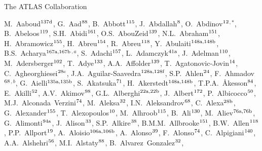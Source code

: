 \begin{flushleft}
{\Large The ATLAS Collaboration}

\bigskip

M.~Aaboud$^\textrm{\scriptsize 137d}$,
G.~Aad$^\textrm{\scriptsize 88}$,
B.~Abbott$^\textrm{\scriptsize 115}$,
J.~Abdallah$^\textrm{\scriptsize 8}$,
O.~Abdinov$^\textrm{\scriptsize 12}$$^{,*}$,
B.~Abeloos$^\textrm{\scriptsize 119}$,
S.H.~Abidi$^\textrm{\scriptsize 161}$,
O.S.~AbouZeid$^\textrm{\scriptsize 139}$,
N.L.~Abraham$^\textrm{\scriptsize 151}$,
H.~Abramowicz$^\textrm{\scriptsize 155}$,
H.~Abreu$^\textrm{\scriptsize 154}$,
R.~Abreu$^\textrm{\scriptsize 118}$,
Y.~Abulaiti$^\textrm{\scriptsize 148a,148b}$,
B.S.~Acharya$^\textrm{\scriptsize 167a,167b}$$^{,a}$,
S.~Adachi$^\textrm{\scriptsize 157}$,
L.~Adamczyk$^\textrm{\scriptsize 41a}$,
J.~Adelman$^\textrm{\scriptsize 110}$,
M.~Adersberger$^\textrm{\scriptsize 102}$,
T.~Adye$^\textrm{\scriptsize 133}$,
A.A.~Affolder$^\textrm{\scriptsize 139}$,
T.~Agatonovic-Jovin$^\textrm{\scriptsize 14}$,
C.~Agheorghiesei$^\textrm{\scriptsize 28c}$,
J.A.~Aguilar-Saavedra$^\textrm{\scriptsize 128a,128f}$,
S.P.~Ahlen$^\textrm{\scriptsize 24}$,
F.~Ahmadov$^\textrm{\scriptsize 68}$$^{,b}$,
G.~Aielli$^\textrm{\scriptsize 135a,135b}$,
S.~Akatsuka$^\textrm{\scriptsize 71}$,
H.~Akerstedt$^\textrm{\scriptsize 148a,148b}$,
T.P.A.~{\AA}kesson$^\textrm{\scriptsize 84}$,
E.~Akilli$^\textrm{\scriptsize 52}$,
A.V.~Akimov$^\textrm{\scriptsize 98}$,
G.L.~Alberghi$^\textrm{\scriptsize 22a,22b}$,
J.~Albert$^\textrm{\scriptsize 172}$,
P.~Albicocco$^\textrm{\scriptsize 50}$,
M.J.~Alconada~Verzini$^\textrm{\scriptsize 74}$,
M.~Aleksa$^\textrm{\scriptsize 32}$,
I.N.~Aleksandrov$^\textrm{\scriptsize 68}$,
C.~Alexa$^\textrm{\scriptsize 28b}$,
G.~Alexander$^\textrm{\scriptsize 155}$,
T.~Alexopoulos$^\textrm{\scriptsize 10}$,
M.~Alhroob$^\textrm{\scriptsize 115}$,
B.~Ali$^\textrm{\scriptsize 130}$,
M.~Aliev$^\textrm{\scriptsize 76a,76b}$,
G.~Alimonti$^\textrm{\scriptsize 94a}$,
J.~Alison$^\textrm{\scriptsize 33}$,
S.P.~Alkire$^\textrm{\scriptsize 38}$,
B.M.M.~Allbrooke$^\textrm{\scriptsize 151}$,
B.W.~Allen$^\textrm{\scriptsize 118}$,
P.P.~Allport$^\textrm{\scriptsize 19}$,
A.~Aloisio$^\textrm{\scriptsize 106a,106b}$,
A.~Alonso$^\textrm{\scriptsize 39}$,
F.~Alonso$^\textrm{\scriptsize 74}$,
C.~Alpigiani$^\textrm{\scriptsize 140}$,
A.A.~Alshehri$^\textrm{\scriptsize 56}$,
M.I.~Alstaty$^\textrm{\scriptsize 88}$,
B.~Alvarez~Gonzalez$^\textrm{\scriptsize 32}$,
$$
\end{flushleft}
